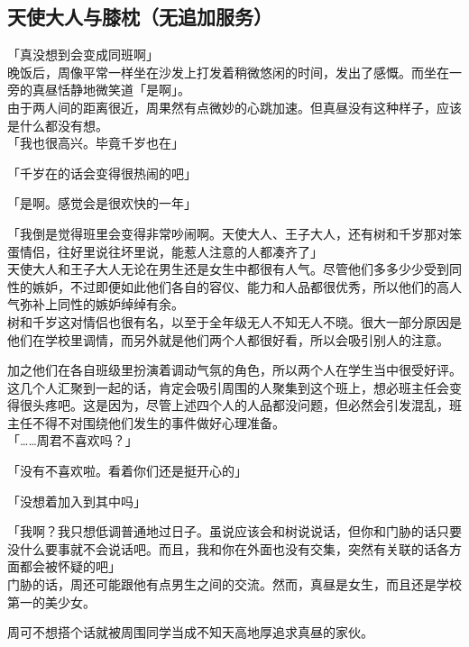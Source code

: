 \subsection{天使大人与膝枕（无追加服务）}

「真没想到会变成同班啊」\\

晚饭后，周像平常一样坐在沙发上打发着稍微悠闲的时间，发出了感慨。而坐在一旁的真昼恬静地微笑道「是啊」。\\

由于两人间的距离很近，周果然有点微妙的心跳加速。但真昼没有这种样子，应该是什么都没有想。\\

「我也很高兴。毕竟千岁也在」

「千岁在的话会变得很热闹的吧」

「是啊。感觉会是很欢快的一年」

「我倒是觉得班里会变得非常吵闹啊。天使大人、王子大人，还有树和千岁那对笨蛋情侣，往好里说往坏里说，能惹人注意的人都凑齐了」\\

天使大人和王子大人无论在男生还是女生中都很有人气。尽管他们多多少少受到同性的嫉妒，不过即便如此他们各自的容仪、能力和人品都很优秀，所以他们的高人气弥补上同性的嫉妒绰绰有余。\\

树和千岁这对情侣也很有名，以至于全年级无人不知无人不晓。很大一部分原因是他们在学校里调情，而另外就是他们两个人都很好看，所以会吸引别人的注意。

加之他们在各自班级里扮演着调动气氛的角色，所以两个人在学生当中很受好评。\\

这几个人汇聚到一起的话，肯定会吸引周围的人聚集到这个班上，想必班主任会变得很头疼吧。这是因为，尽管上述四个人的人品都没问题，但必然会引发混乱，班主任不得不对围绕他们发生的事件做好心理准备。\\

「……周君不喜欢吗？」

「没有不喜欢啦。看着你们还是挺开心的」

「没想着加入到其中吗」

「我啊？我只想低调普通地过日子。虽说应该会和树说说话，但你和门胁的话只要没什么要事就不会说话吧。而且，我和你在外面也没有交集，突然有关联的话各方面都会被怀疑的吧」\\

门胁的话，周还可能跟他有点男生之间的交流。然而，真昼是女生，而且还是学校第一的美少女。

周可不想搭个话就被周围同学当成不知天高地厚追求真昼的家伙。\\

